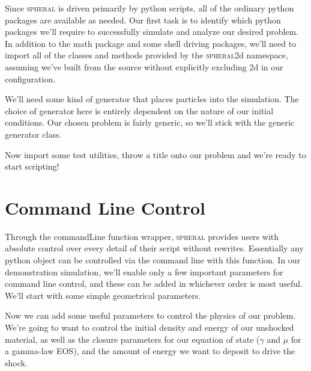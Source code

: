 \documentclass[11pt]{memoir}
\begin{document}
Since \textsc{spheral} is driven primarily by python scripts, all of the ordinary python packages are available as needed. 
Our first task is to identify which python packages we'll require to successfully simulate and analyze our desired problem. 
In addition to the math package and some shell driving packages, we'll need to import all of the classes and methods provided by the \textsc{spheral}2d namespace, assuming we've built from the source without explicitly excluding 2d in our configuration.



We'll need some kind of generator that places particles into the simulation. 
The choice of generator here is entirely dependent on the nature of our initial conditions. 
Our chosen problem is fairly generic, so we'll stick with the generic generator class.



Now import some test utilities, throw a title onto our problem and we're ready to start scripting!



\section{Command Line Control}

Through the commandLine function wrapper, \textsc{spheral} provides users with absolute control over every detail of their script without rewrites. 
Essentially any python object can be controlled via the command line with this function. 
In our demonstration simulation, we'll enable only a few important parameters for command line control, and these can be added in whichever order is most useful. 
We'll start with some simple geometrical parameters.



Now we can add some useful parameters to control the physics of our problem. 
We're going to want to control the initial density and energy of our unshocked material, as well as the closure parameters for our equation of state ($\gamma$ and $\mu$ for a gamma-law EOS), and the amount of energy we want to deposit to drive the shock.


\end{document}
